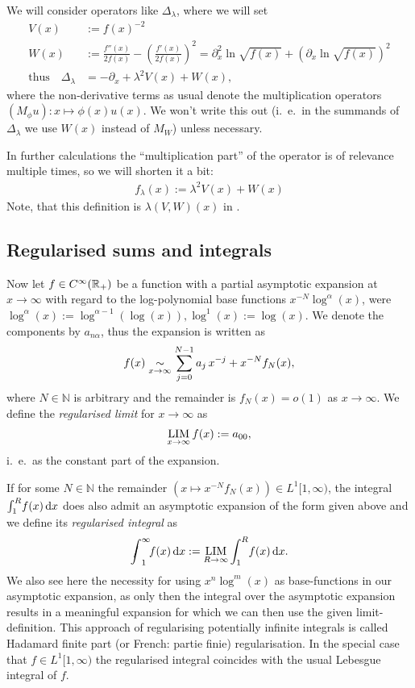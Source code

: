 We will consider operators like $\Delta_\lambda$, where we will set
\begin{align}
  V(x) &:= f(x)^{-2} \\
  W(x) &:= \frac{f''(x)}{2f(x)} - \left(\frac{f'(x)}{2f(x)}\right)^2 =
  \partial_x^2 \ln\sqrt{f(x)} + \left(\partial_x \ln\sqrt{f(x)}\right)^2 \\
  \text{thus}\quad \Delta_\lambda &= -\partial_x + \lambda^2 V(x) + W(x),
\end{align}
where the non-derivative terms as usual denote the multiplication operators
$(M_\phi u)\colon x \mapsto \phi(x)u(x)$. We won't write this out (i.~e.\ in the
summands of $\Delta_\lambda$ we use $W(x)$ instead of $M_W$) unless necessary.

In further calculations the "`multiplication part"' of the operator is of
relevance multiple times, so we will shorten it a bit:
\begin{align}
  \label{def:f-lambda}
  f_{\lambda}(x) := \lambda^2 V(x) + W(x)
\end{align}
Note, that this definition is $\lambda(V,W)(x)$ in \cite{LV13}.

\subsection{Regularised sums and integrals}

Now let $f\in\Cinf(\Rplus)$ be a function with a partial asymptotic expansion at
$x\to\infty$ with regard to the log-polynomial base functions $x^{-N}
\log^\alpha(x)$, were $\log^\alpha(x) := \log^{\alpha-1}(\log(x)), \log^1(x) :=
\log(x)$. We denote the components by $a_{n\alpha}$, thus the expansion is
written as
\begin{align*}
  f(x) \SimAs{x\to\infty} \sum_{j=0}^{N-1} a_{j}\,x^{-j} + x^{-N}f_N(x),
\end{align*}
where $N\in\mathbb{N}$ is arbitrary and the remainder is $f_N(x) = o(1)$ as
$x\to\infty$. We define the \emph{regularised limit} for $x\to\infty$ as
\begin{align}
  \Reglim_{x\to\infty} f(x) := a_{00},
\end{align}
i.~e.\ as the constant part of the expansion.

If for some $N\in\mathbb{N}$ the remainder $(x\mapsto x^{-N}f_N(x))\in
L^1[1,\infty)$, the integral $\Integ[R]{1}{x}{f(x)}$ does also admit an
asymptotic expansion of the form given above and we define its \emph{regularised
integral} as
\begin{align}
  \Regint{x}{f(x)} := \Reglim_{R\to\infty}\Integ[R]{1}{x}{f(x)}.
\end{align}
We also see here the necessity for using $x^n \log^m(x)$ as base-functions in
our asymptotic expansion, as only then the integral over the asymptotic
expansion results in a meaningful expansion for which we can then use the given
limit-definition. This approach of regularising potentially infinite integrals
is called Hadamard finite part (or French: partie finie) regularisation. In the
special case that $f\in L^1[1,\infty)$ the regularised integral coincides with
the usual Lebesgue integral of $f$.

